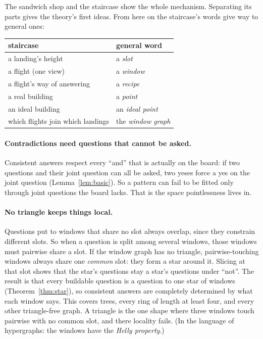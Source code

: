 \documentclass[11pt]{article}
\theoremstyle{plain}
\theoremstyle{definition}
\begin{document}
The sandwich shop and the staircase show the whole mechanism. Separating its parts gives the
theory's first ideas.
From here on the staircase's words give way to general ones:

\begin{center}\small
\begin{tabular}{l l}
\textbf{staircase} & \textbf{general word}\\\hline
a landing's height & a \emph{slot}\\
a flight (one view) & a \emph{window}\\
a flight's way of answering & a \emph{recipe}\\
a real building & a \emph{point}\\
an ideal building & an \emph{ideal point}\\
which flights join which landings & the \emph{window graph}\\
\end{tabular}
\end{center}

\paragraph{Contradictions need questions that cannot be asked.} Consistent
answers respect every ``and'' that is actually on the board: if two questions
and their joint question can all be asked, two yeses force a yes on the joint
question (Lemma~\ref{lem:basic}). So a pattern can fail to be fitted only
through joint questions the board lacks. That is the space pointlessness lives
in.

\paragraph{No triangle keeps things local.} Questions put to windows that share
no slot always overlap, since they constrain different slots. So when a question
is split among several windows, those windows must pairwise share a slot. If the
window graph has no triangle, pairwise-touching windows always share one
\emph{common} slot: they form a star around it. Slicing at that slot shows that
the star's questions stay a star's questions under ``not''. The result is that
every buildable question is a question to one star of windows
(Theorem~\ref{thm:star}), so consistent answers are completely determined by what
each window says. This covers trees, every ring of length at least four, and
every other triangle-free graph. A triangle is the one shape where three windows
touch pairwise with no common slot, and there locality fails.
(In the language of hypergraphs: the windows have the \emph{Helly property}.)
\end{document}
